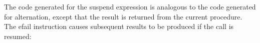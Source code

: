 \begin{center}
\tabletail{}
\tablelasttail{}
\begin{supertabular}{|m{1.9073598in}|m{2.75596in}|}

\end{supertabular}
\end{center}

\bigskip

\begin{center}
\tabletail{}
\tablelasttail{}
\begin{supertabular}{|m{1.9073598in}|m{2.75596in}|}

\end{supertabular}
\end{center}

The code generated for the suspend expression is analogous to the code
generated for alternation, except that the result is returned from the
current procedure. The efail instruction causes subsequent results to
be produced if the call is resumed:

